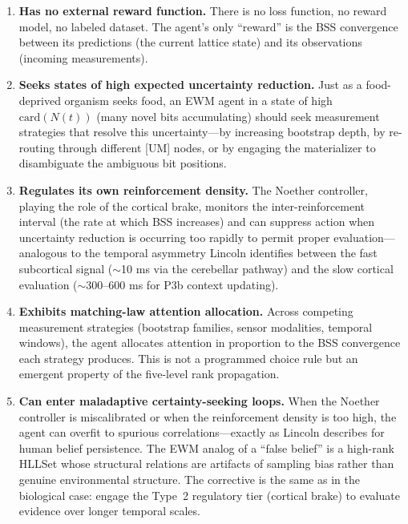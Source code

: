 \documentclass[11pt,a4paper]{article}
\theoremstyle{remark}
\begin{document}
\begin{enumerate}[leftmargin=*,nosep]
  \item \textbf{Has no external reward function.} There is no loss function,
    no reward model, no labeled dataset. The agent's only ``reward'' is the BSS
    convergence between its predictions (the current lattice state) and its
    observations (incoming measurements).
  \item \textbf{Seeks states of high expected uncertainty reduction.} Just as
    a food-deprived organism seeks food, an EWM agent in a state of high
    $\text{card}(N(t))$ (many novel bits accumulating) should seek measurement
    strategies that resolve this uncertainty---by increasing bootstrap depth,
    by re-routing through different [UM] nodes, or by engaging the materializer
    to disambiguate the ambiguous bit positions.
  \item \textbf{Regulates its own reinforcement density.} The Noether
    controller, playing the role of the cortical brake, monitors the
    inter-reinforcement interval (the rate at which BSS increases) and can
    suppress action when uncertainty reduction is occurring too rapidly to
    permit proper evaluation---analogous to the temporal asymmetry Lincoln
    identifies between the fast subcortical signal ($\sim$10 ms via the
    cerebellar pathway) and the slow cortical evaluation ($\sim$300--600 ms for
    P3b context updating).
  \item \textbf{Exhibits matching-law attention allocation.} Across competing
    measurement strategies (bootstrap families, sensor modalities, temporal
    windows), the agent allocates attention in proportion to the BSS convergence
    each strategy produces. This is not a programmed choice rule but an emergent
    property of the five-level rank propagation.
  \item \textbf{Can enter maladaptive certainty-seeking loops.} When the
    Noether controller is miscalibrated or when the reinforcement density is too
    high, the agent can overfit to spurious correlations---exactly as Lincoln
    describes for human belief persistence. The EWM analog of a ``false belief''
    is a high-rank HLLSet whose structural relations are artifacts of sampling
    bias rather than genuine environmental structure. The corrective is the same
    as in the biological case: engage the Type~2 regulatory tier (cortical
    brake) to evaluate evidence over longer temporal scales.
\end{enumerate}
\end{document}

